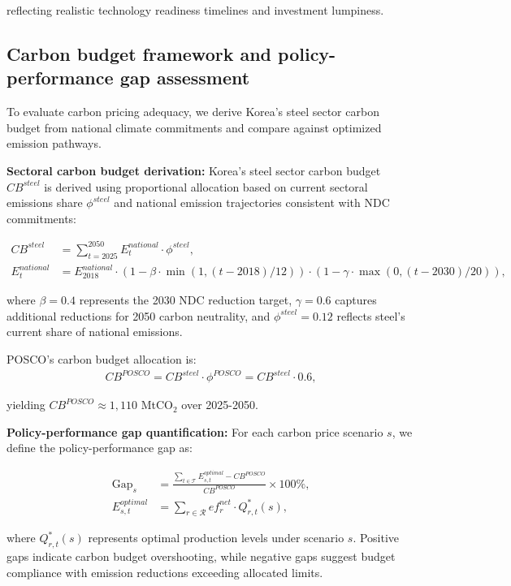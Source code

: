 \documentclass[preprint,1p,authoryear]{elsarticle}
\begin{document}
reflecting realistic technology readiness timelines and investment lumpiness.

\subsection{Carbon budget framework and policy-performance gap assessment}

To evaluate carbon pricing adequacy, we derive Korea's steel sector carbon budget from national climate commitments and compare against optimized emission pathways.

\textbf{Sectoral carbon budget derivation:}
Korea's steel sector carbon budget $CB^{steel}$ is derived using proportional allocation based on current sectoral emissions share $\phi^{steel}$ and national emission trajectories consistent with NDC commitments:

\begin{align}
CB^{steel} &= \sum_{t=2025}^{2050} E^{national}_t \cdot \phi^{steel}, \label{eq:budget_total}\\
E^{national}_t &= E^{national}_{2018} \cdot (1 - \beta \cdot \min(1, (t-2018)/12)) \cdot (1 - \gamma \cdot \max(0, (t-2030)/20)), \label{eq:national_trajectory}
\end{align}

where $\beta = 0.4$ represents the 2030 NDC reduction target, $\gamma = 0.6$ captures additional reductions for 2050 carbon neutrality, and $\phi^{steel} = 0.12$ reflects steel's current share of national emissions.

POSCO's carbon budget allocation is:
\begin{align}
CB^{POSCO} = CB^{steel} \cdot \phi^{POSCO} = CB^{steel} \cdot 0.6, \label{eq:posco_budget}
\end{align}

yielding $CB^{POSCO} \approx 1{,}110$ MtCO$_2$ over 2025-2050.

\textbf{Policy-performance gap quantification:}
For each carbon price scenario $s$, we define the policy-performance gap as:

\begin{align}
\text{Gap}_s &= \frac{\sum_{t \in \mathcal{T}} E_{s,t}^{optimal} - CB^{POSCO}}{CB^{POSCO}} \times 100\%, \label{eq:gap}\\
E_{s,t}^{optimal} &= \sum_{r \in \mathcal{R}} ef_r^{net} \cdot Q_{r,t}^*(s), \label{eq:optimal_emissions}
\end{align}

where $Q_{r,t}^*(s)$ represents optimal production levels under scenario $s$. Positive gaps indicate carbon budget overshooting, while negative gaps suggest budget compliance with emission reductions exceeding allocated limits.
\end{document}
